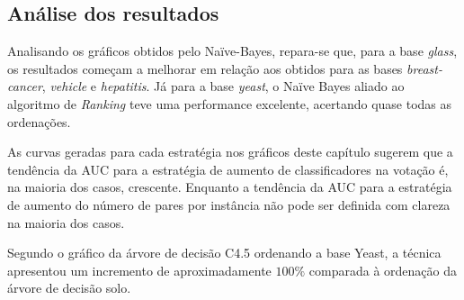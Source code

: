 \clearpage
\pagebreak


\subsection{Análise dos resultados}

Analisando os gráficos obtidos pelo Naïve-Bayes, repara-se que, para a base \emph{glass}, os resultados começam a melhorar em relação aos obtidos para as bases \emph{breast-cancer}, \emph{vehicle} e \emph{hepatitis}. Já para a base \emph{yeast}, o Naïve Bayes aliado ao algoritmo de \emph{Ranking} teve uma performance excelente, acertando quase todas as ordenações.

As curvas geradas para cada estratégia nos gráficos deste capítulo sugerem que a tendência da AUC para a estratégia de aumento de classificadores na votação é, na maioria dos casos, crescente. Enquanto a tendência da AUC para a estratégia de aumento do número de pares por instância não pode ser definida com clareza na maioria dos casos.

Segundo o gráfico da árvore de decisão C4.5 ordenando a base Yeast, a técnica apresentou um incremento de aproximadamente $100\%$ comparada à ordenação da árvore de decisão solo.